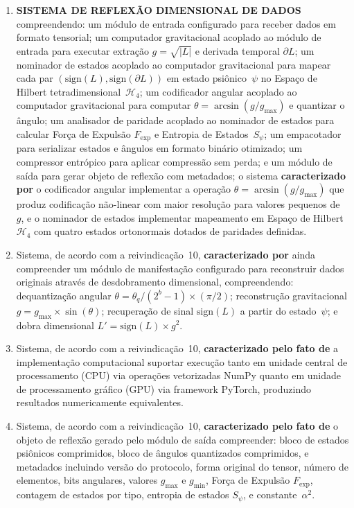 \documentclass[12pt,a4paper]{article}
\newcommand{\alphaii}{\alpha^2}
\newcommand{\Fexp}{F_{\text{exp}}}
\newcommand{\Hfour}{\mathcal{H}_4}
\begin{document}
\begin{enumerate}
\item \textbf{SISTEMA DE REFLEXÃO DIMENSIONAL DE DADOS}
compreendendo: um módulo de entrada configurado para receber
dados em formato tensorial; um computador gravitacional acoplado
ao módulo de entrada para executar extração $g = \sqrt{|L|}$ e
derivada temporal $\partial L$; um nominador de estados acoplado
ao computador gravitacional para mapear cada par
$(\text{sign}(L), \text{sign}(\partial L))$ em estado
psiônico~$\psi$ no Espaço de Hilbert
tetradimensional~$\Hfour$; um codificador angular acoplado ao
computador gravitacional para computar
$\theta = \arcsin(g/g_{\max})$ e quantizar o ângulo; um
analisador de paridade acoplado ao nominador de estados para
calcular Força de Expulsão $\Fexp$ e Entropia de
Estados~$S_\psi$; um empacotador para serializar estados e
ângulos em formato binário otimizado; um compressor entrópico
para aplicar compressão sem perda; e um módulo de saída para
gerar objeto de reflexão com metadados; o sistema
\textbf{caracterizado por} o codificador angular implementar a
operação $\theta = \arcsin(g/g_{\max})$ que produz codificação
não-linear com maior resolução para valores pequenos de~$g$, e
o nominador de estados implementar mapeamento em Espaço de
Hilbert~$\Hfour$ com quatro estados ortonormais dotados de
paridades definidas.

\item Sistema, de acordo com a reivindicação~10,
\textbf{caracterizado por} ainda compreender um módulo de
manifestação configurado para reconstruir dados originais
através de desdobramento dimensional, compreendendo:
dequantização angular
$\theta = \theta_q / (2^b - 1) \times (\pi/2)$; reconstrução
gravitacional $g = g_{\max} \times \sin(\theta)$; recuperação
de sinal $\text{sign}(L)$ a partir do estado~$\psi$; e dobra
dimensional $L' = \text{sign}(L) \times g^2$.

\item Sistema, de acordo com a reivindicação~10,
\textbf{caracterizado pelo fato de} a implementação
computacional suportar execução tanto em unidade central de
processamento (CPU) via operações vetorizadas NumPy quanto em
unidade de processamento gráfico (GPU) via framework PyTorch,
produzindo resultados numericamente equivalentes.

\item Sistema, de acordo com a reivindicação~10,
\textbf{caracterizado pelo fato de} o objeto de reflexão gerado
pelo módulo de saída compreender: bloco de estados psiônicos
comprimidos, bloco de ângulos quantizados comprimidos, e
metadados incluindo versão do protocolo, forma original do
tensor, número de elementos, bits angulares, valores $g_{\max}$
e $g_{\min}$, Força de Expulsão $\Fexp$, contagem de estados
por tipo, entropia de estados $S_\psi$, e constante~$\alphaii$.

\end{enumerate}
\end{document}
